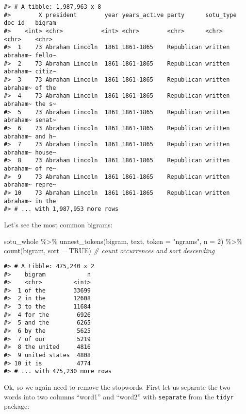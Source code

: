 \documentclass[
]{book}
\newenvironment{Shaded}{\begin{snugshade}}{\end{snugshade}}
\newcommand{\AttributeTok}[1]{\textcolor[rgb]{0.77,0.63,0.00}{#1}}
\newcommand{\CommentTok}[1]{\textcolor[rgb]{0.56,0.35,0.01}{\textit{#1}}}
\newcommand{\ConstantTok}[1]{\textcolor[rgb]{0.00,0.00,0.00}{#1}}
\newcommand{\DecValTok}[1]{\textcolor[rgb]{0.00,0.00,0.81}{#1}}
\newcommand{\FunctionTok}[1]{\textcolor[rgb]{0.00,0.00,0.00}{#1}}
\newcommand{\NormalTok}[1]{#1}
\newcommand{\SpecialCharTok}[1]{\textcolor[rgb]{0.00,0.00,0.00}{#1}}
\newcommand{\StringTok}[1]{\textcolor[rgb]{0.31,0.60,0.02}{#1}}
\begin{document}
\begin{verbatim}
#> # A tibble: 1,987,963 x 8
#>        X president        year years_active party      sotu_type doc_id   bigram
#>    <int> <chr>           <int> <chr>        <chr>      <chr>     <chr>    <chr> 
#>  1    73 Abraham Lincoln  1861 1861-1865    Republican written   abraham~ fello~
#>  2    73 Abraham Lincoln  1861 1861-1865    Republican written   abraham~ citiz~
#>  3    73 Abraham Lincoln  1861 1861-1865    Republican written   abraham~ of the
#>  4    73 Abraham Lincoln  1861 1861-1865    Republican written   abraham~ the s~
#>  5    73 Abraham Lincoln  1861 1861-1865    Republican written   abraham~ senat~
#>  6    73 Abraham Lincoln  1861 1861-1865    Republican written   abraham~ and h~
#>  7    73 Abraham Lincoln  1861 1861-1865    Republican written   abraham~ house~
#>  8    73 Abraham Lincoln  1861 1861-1865    Republican written   abraham~ of re~
#>  9    73 Abraham Lincoln  1861 1861-1865    Republican written   abraham~ repre~
#> 10    73 Abraham Lincoln  1861 1861-1865    Republican written   abraham~ in the
#> # ... with 1,987,953 more rows
\end{verbatim}

Let's see the most common bigrams:

\begin{Shaded}
\begin{Highlighting}[]
\NormalTok{sotu\_whole }\SpecialCharTok{\%\textgreater{}\%}
  \FunctionTok{unnest\_tokens}\NormalTok{(bigram, text, }\AttributeTok{token =} \StringTok{"ngrams"}\NormalTok{, }\AttributeTok{n =} \DecValTok{2}\NormalTok{) }\SpecialCharTok{\%\textgreater{}\%} 
  \FunctionTok{count}\NormalTok{(bigram, }\AttributeTok{sort =} \ConstantTok{TRUE}\NormalTok{) }\CommentTok{\# count occurrences and sort descending}
\end{Highlighting}
\end{Shaded}

\begin{verbatim}
#> # A tibble: 475,240 x 2
#>    bigram            n
#>    <chr>         <int>
#>  1 of the        33699
#>  2 in the        12608
#>  3 to the        11684
#>  4 for the        6926
#>  5 and the        6265
#>  6 by the         5625
#>  7 of our         5219
#>  8 the united     4816
#>  9 united states  4808
#> 10 it is          4774
#> # ... with 475,230 more rows
\end{verbatim}

Ok, so we again need to remove the stopwords. First let us separate the two words into two columns ``word1'' and ``word2'' with \texttt{separate} from the \texttt{tidyr} package:
\end{document}
